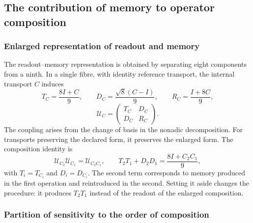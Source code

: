 \subsection{The contribution of memory to operator composition}
\label{md:restop:memoria}

\subsubsection{Enlarged representation of readout and memory}
\label{md:restop:estructura-partida}

The readout--memory representation is obtained by separating eight
components from a ninth. In a single fibre, with identity reference
transport, the internal transport $C$ induces
\begin{equation}
 T_C=\frac{8I+C}{9},\qquad
 D_C=\frac{\sqrt8(C-I)}{9},\qquad
 R_C=\frac{I+8C}{9},
 \label{md:restop:bloques}
\end{equation}
\begin{equation}
 \mathcal U_C=
 \begin{pmatrix}
 T_C&D_C\\D_C&R_C
 \end{pmatrix}.
 \label{md:restop:transporte-ampliado}
\end{equation}
The coupling arises from the change of basis in the nonadic decomposition.
For transports preserving the declared form, it preserves the enlarged
form. The composition identity is
\begin{equation}
 \mathcal U_{C_2}\mathcal U_{C_1}
 =\mathcal U_{C_2C_1},\qquad
 T_2T_1+D_2D_1=\frac{8I+C_2C_1}{9},
 \label{md:restop:composicion-ampliada}
\end{equation}
with $T_i=T_{C_i}$ and $D_i=D_{C_i}$.
The second term corresponds to memory produced in the first
operation and reintroduced in the second. Setting it aside changes the
procedure: it produces $T_2T_1$ instead of the readout of the enlarged
composition.

\subsubsection{Partition of sensitivity to the order of composition}
\label{md:restop:conmutadores}


